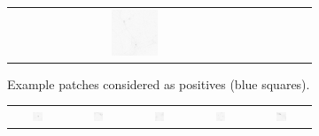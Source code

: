 \begin{figure}
\begin{subfigure}{0.45\textwidth}
\begin{tabular}{c@{\,}c@{\,}c@{\,}c@{\,}c@{}}
			\includegraphics[width=0.19\textwidth]{fig01b15}
		\end{tabular}
		\vspace{-0.5em}
		\caption{Example patches considered as positives (blue squares).}
	\end{subfigure}
	\hspace{0.05\textwidth}
	\begin{subfigure}{0.45\textwidth}
		\centering
		\begin{tabular}{c@{\,}c@{\,}c@{\,}c@{\,}c@{}}
			\includegraphics[width=0.19\textwidth]{fig01c01} &
			\includegraphics[width=0.19\textwidth]{fig01c02} &
			\includegraphics[width=0.19\textwidth]{fig01c03} &
			\includegraphics[width=0.19\textwidth]{fig01c04} &
			\includegraphics[width=0.19\textwidth]{fig01c05} \\

\end{tabular}
\end{subfigure}
\end{figure}
